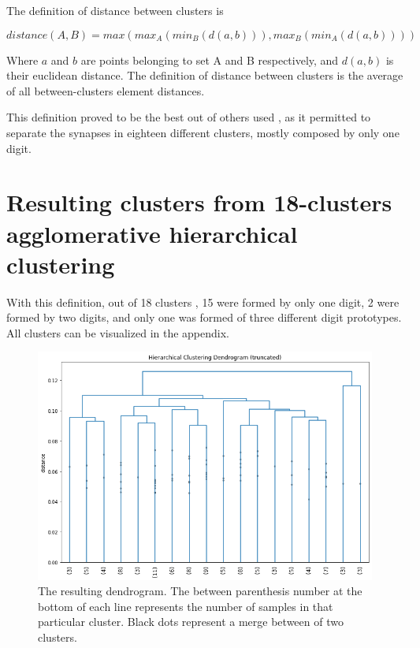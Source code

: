 \documentclass[a4paper]{report}
\begin{document}
The definition of distance between clusters is

\begin{equation}
    distance(A, B) = max(max_A(min_B(d(a,b))), max_B(min_A(d(a,b))))
\end{equation}

Where $a$ and $b$ are points belonging to set A and B respectively, and $d(a,b)$ is their euclidean distance.
The definition of distance between clusters is the average of all between-clusters element distances.

This definition proved to be the best out of others used , as it permitted to separate the synapses in eighteen different clusters, mostly composed by only one digit.



\section{Resulting clusters from 18-clusters agglomerative hierarchical clustering}


With this definition, out of 18 clusters , 15 were formed by only one digit, 2 were formed by two digits, and only one was formed of three different digit prototypes.
All clusters can be visualized in the appendix. 

\begin{figure} [H]
    \centering
    \includegraphics [width=\textwidth]{o/clustering.png}
    \caption{The resulting dendrogram. The between parenthesis number at the bottom of each line represents the number of samples in that particular cluster. Black dots represent a merge between of two clusters.}
    \label{clustering}
\end{figure}
\end{document}
